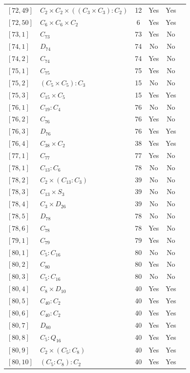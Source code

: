 \documentclass[12pt, a4paper]{article}
\theoremstyle{plain}
\theoremstyle{definition}
\begin{document}
\begin{longtable}{llcccl}
  $[72,49]$ & $C_2 \times C_2 \times ((C_3 \times C_3) : C_2)$ & 12 & Yes & Yes \\
  $[72,50]$ & $C_6 \times C_6 \times C_2$ & 6 & Yes & Yes \\
  $[73,1]$ & $C_{73}$ & 73 & Yes & No \\
  $[74,1]$ & $D_{74}$ & 74 & No & No \\
  $[74,2]$ & $C_{74}$ & 74 & Yes & No \\
  $[75,1]$ & $C_{75}$ & 75 & Yes & No \\
  $[75,2]$ & $(C_5 \times C_5) : C_3$ & 15 & No & No \\
  $[75,3]$ & $C_{15} \times C_5$ & 15 & Yes & Yes \\
  $[76,1]$ & $C_{19} : C_4$ & 76 & No & No \\
  $[76,2]$ & $C_{76}$ & 76 & Yes & No \\
  $[76,3]$ & $D_{76}$ & 76 & Yes & Yes \\
  $[76,4]$ & $C_{38} \times C_2$ & 38 & Yes & Yes \\
  $[77,1]$ & $C_{77}$ & 77 & Yes & No \\
  $[78,1]$ & $C_{13} : C_6$ & 78 & No & No \\
  $[78,2]$ & $C_2 \times (C_{13} : C_3)$ & 39 & No & No \\
  $[78,3]$ & $C_{13} \times S_3$ & 39 & No & No \\
  $[78,4]$ & $C_3 \times D_{26}$ & 39 & No & No \\
  $[78,5]$ & $D_{78}$ & 78 & No & No \\
  $[78,6]$ & $C_{78}$ & 78 & Yes & No \\
  $[79,1]$ & $C_{79}$ & 79 & Yes & No \\
  $[80,1]$ & $C_5 : C_{16}$ & 80 & No & No \\
  $[80,2]$ & $C_{80}$ & 80 & Yes & No \\
  $[80,3]$ & $C_5 : C_{16}$ & 80 & No & No \\
  $[80,4]$ & $C_8 \times D_{10}$ & 40 & Yes & Yes \\
  $[80,5]$ & $C_{40} : C_2$ & 40 & Yes & Yes \\
  $[80,6]$ & $C_{40} : C_2$ & 40 & Yes & Yes \\
  $[80,7]$ & $D_{80}$ & 40 & Yes & Yes \\
  $[80,8]$ & $C_5 : Q_{16}$ & 40 & Yes & Yes \\
  $[80,9]$ & $C_2 \times (C_5 : C_8)$ & 40 & Yes & Yes \\
  $[80,10]$ & $(C_5 : C_8) : C_2$ & 40 & Yes & Yes \\

\end{longtable}
\end{document}
